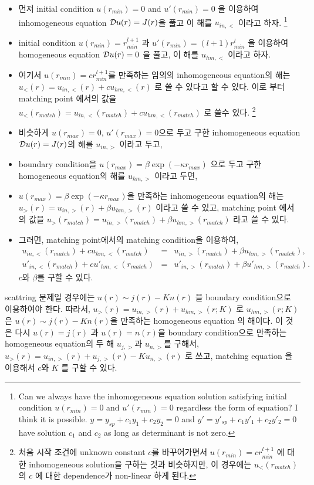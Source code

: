 \documentclass[10pt]{article}
\newcommand{\bea}{\begin{eqnarray}}
\newcommand{\eea}{\end{eqnarray}}
\newcommand{\no}{\nonumber \\}
\begin{document}
\begin{itemize}
\item  먼저 initial condition $u(r_{min})=0$ and $u'(r_{min})=0$ 을 이용하여 
       inhomogeneous equation ${\cal D}u(r)=J(r)$을 풀고 이 해를 $u_{in,<}$ 이라고 하자. 
       \footnote{ Can we always have the inhomogeneous equation solution 
       satisfying initial condition $u(r_{min})=0$ and $u'(r_{min})=0$ regardless 
       the form of equation? I think it is possible. 
       $y=y_{sp}+c_1 y_1+c_2 y_2=0$ and 
       $y'=y'_{sp}+c_1 y'_1+c_2 y'_2=0$ have solution $c_1$ and $c_2$
       as long as determinant is not zero.       
       } 
\item initial condition $u(r_{min})=r_{min}^{l+1}$ 과 $u'(r_{min})=(l+1)r_{min}^l$ 을 
      이용하여 homogeneous equation ${\cal D}u(r)=0$ 을 풀고, 이 해를 
      $u_{hm,<}$ 이라고 하자. 
\item 여기서 $u(r_{min})= c r_{min}^{l+1}$를 만족하는 임의의 inhomogeneous equation의 해는 
      $u_{<}(r)=u_{in,<}(r)+c u_{hm,<}(r)$ 로 쓸 수 있다고 할 수 있다.
      이로 부터 matching point 에서의 값을 
      $u_{<}(r_{match})=u_{in,<}(r_{match})+c u_{hm,<}(r_{match})$ 로 쓸수 있다.
      \footnote{ 처음 시작 조건에 unknown constant $c$를 바꾸어가면서 
      $u(r_{min})= c r_{min}^{l+1}$ 에 대한 inhomogeneous solution을 구하는 것과 비슷하지만,
      이 경우에는 $u_{<}(r_{match})$ 의 $c$ 에 대한 dependence가 non-linear 하게 된다. 
      } 
\item 비슷하게 $u(r_{max})=0$, $u'(r_{max})=0$으로 두고 구한 inhomogeneous equation        
      ${\cal D}u(r)=J(r)$의 해를 $u_{in,>}$ 이라고 두고,
\item boundary condition을 $u(r_{max})= \beta \exp(-\kappa r_{max})$ 으로 두고 
      구한 homogeneous equation의 해를 $u_{hm,>}$ 이라고 두면,
\item $u(r_{max})= \beta \exp(-\kappa r_{max})$을 만족하는 
      inhomogeneous equation의 해는 
      $u_{>}(r)=u_{in,>}(r)+\beta u_{hm,>}(r)$ 이라고 쓸 수 있고,
      matching point 에서의 값을 
      $u_{>}(r_{match})=u_{in,>}(r_{match})+\beta u_{hm,>}(r_{match})$
      라고 쓸 수 있다. 
\item 그러면, matching point에서의 matching condition을 이용하여,
     \bea 
     u_{in,<}(r_{match})+c u_{hm,<}(r_{match})&=&u_{in,>}(r_{match})+\beta u_{hm,>}(r_{match}),\no 
     u'_{in,<}(r_{match})+c u'_{hm,<}(r_{match})&=&u'_{in,>}(r_{match})+\beta u'_{hm,>}(r_{match}).
     \eea 
     $c$와 $\beta$를 구할 수 있다.                     
\end{itemize}
scattring 문제일 경우에는 $u(r)\sim j(r)-K n(r)$ 을 boundary condition으로 이용하여야 한다. 
따라서, $u_{>}(r)=u_{in,>}(r)+u_{hm,>}(r;K)$ 로   $u_{hm,>}(r;K)$ 은 
$u(r)\sim j(r)-K n(r)$을 만족하는 homogeneous equation 의 해이다. 이 것은 다시 
$u(r)=j(r)$ 과 $u(r)=n(r)$을 boundary condition으로 만족하는 homogeneous equation의 두 해  
$u_{j,>}$과 $u_{n,>}$를 구해서, $u_{>}(r)=u_{in,>}(r)+u_{j,>}(r)-K u_{n,>}(r)$ 로 쓰고,
matching equation 을 이용해서 $c$와 $K$ 를 구할 수 있다. 
\end{document}
